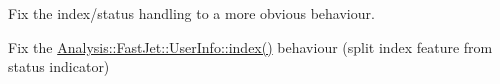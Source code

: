 
\begin{DoxyRefList}
\item[\label{todo__todo000001}%
\hypertarget{todo__todo000001}{}%
Class \hyperlink{classAnalysis_1_1FastJet_1_1UserInfo}{Analysis\+:\+:Fast\+Jet\+:\+:User\+Info} ]Fix the index/status handling to a more obvious behaviour.  
\item[\label{todo__todo000002}%
\hypertarget{todo__todo000002}{}%
Member \hyperlink{structAnalysisHelper_1_1FastJet_a27ddda4131fd0dffbf383882ff10e6c0}{Analysis\+Helper\+:\+:Fast\+Jet\+:\+:user\+Index} (const fastjet\+::\+Pseudo\+Jet \&pj)]Fix the {\ttfamily \hyperlink{classAnalysis_1_1FastJet_1_1UserInfo_a687e6a814e58e5737108ef24aef047df}{Analysis\+::\+Fast\+Jet\+::\+User\+Info\+::index()}} behaviour (split index feature from status indicator) 
\end{DoxyRefList}